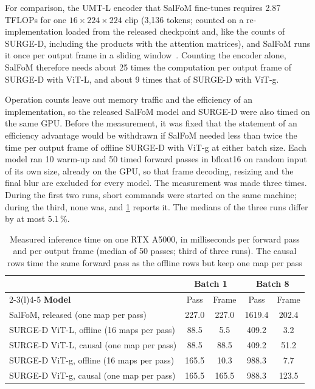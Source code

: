 For comparison, the \acrshort{UMT}-L encoder that SalFoM fine-tunes requires
2.87 \acrshort{TFLOPs} for one $16\times224\times224$ clip (3,136 tokens;
counted on a re-implementation loaded from the released checkpoint and, like
the counts of SURGE-D, including the products with the attention matrices),
and SalFoM runs it once per output frame in a sliding
window~\cite{moradi2024salfom}. Counting the encoder alone, SalFoM therefore
needs about 25 times the computation per output frame of SURGE-D with
\acrshort{ViT}-L, and about 9 times that of SURGE-D with \acrshort{ViT}-g.

Operation counts leave out memory traffic and the efficiency of an
implementation, so the released SalFoM model and SURGE-D were also timed on the
same \acrshort{GPU}. Before the measurement, it was fixed that the statement of
an efficiency advantage would be withdrawn if SalFoM needed less than twice the
time per output frame of offline SURGE-D with \acrshort{ViT}-g at either batch
size. Each model ran 10 warm-up and 50 timed forward passes in bfloat16 on
random input of its own size, already on the \acrshort{GPU}, so that frame
decoding, resizing and the final blur are excluded for every model. The
measurement was made three times. During the first two runs, short commands
were started on the same machine; during the third, none was, and
\cref{tab:timing} reports it. The medians of the three runs differ by at most
5.1\,\%.

\begin{table}[htbp]
  \centering
  \caption{Measured inference time on one RTX A5000, in milliseconds per
  forward pass and per output frame (median of 50 passes; third of three
  runs). The causal rows time the same forward pass as the offline rows but
  keep one map per pass}\label{tab:timing}
  \small
  \begin{tabular}{@{}lcccc@{}}
    \toprule
    & \multicolumn{2}{c}{\textbf{Batch 1}} & \multicolumn{2}{c}{\textbf{Batch 8}} \\
    \cmidrule(lr){2-3}\cmidrule(l){4-5}
    \textbf{Model} & Pass & Frame & Pass & Frame \\
    \midrule
    SalFoM, released (one map per pass)          & 227.0 & 227.0 & 1619.4 & 202.4 \\
    SURGE-D \acrshort{ViT}-L, offline (16 maps per pass) & 88.5 & 5.5 & 409.2 & 3.2 \\
    SURGE-D \acrshort{ViT}-L, causal (one map per pass)  & 88.5 & 88.5 & 409.2 & 51.2 \\
    SURGE-D \acrshort{ViT}-g, offline (16 maps per pass) & 165.5 & 10.3 & 988.3 & 7.7 \\
    SURGE-D \acrshort{ViT}-g, causal (one map per pass)  & 165.5 & 165.5 & 988.3 & 123.5 \\
    \bottomrule
  \end{tabular}
\end{table}

